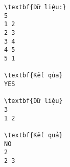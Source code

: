 \begin{verbatim}
\textbf{Dữ liệu:}
5
1 2
2 3
3 4
4 5
5 1

\textbf{Kết qủa}
YES

\textbf{Dữ liệu}
3 
1 2

\textbf{Kết quả}
NO
2
2 3
\end{verbatim}